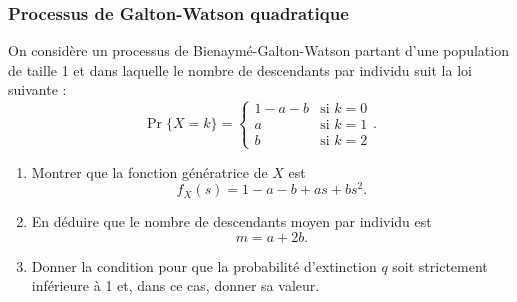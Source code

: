 \subsubsection{Processus de Galton-Watson quadratique} 
  On consid\`ere un processus de Bienaym\'e-Galton-Watson partant d'une population de taille 1 et dans laquelle le nombre de descendants par individu suit la loi suivante :
  $$
  \Pr\{X = k\} = \left\{
    \begin{array}{ll}
      1 - a - b & \text{si $k = 0$} \\
      a & \text{si $k = 1$} \\
      b & \text{si $k = 2$}
    \end{array}\right..
  $$
  \begin{enumerate}
    \item Montrer que la fonction g\'en\'eratrice de $X$ est
    $$
    f_X(s) = 1 - a - b + as + bs^2.
    $$
    \item En d\'eduire que le nombre de descendants moyen par individu est
    $$
    m = a + 2b.
    $$
    \item Donner la condition pour que la probabilit\'e d'extinction $q$ soit strictement inf\'erieure \`a 1 et, dans ce cas, donner sa valeur.
  \end{enumerate}
